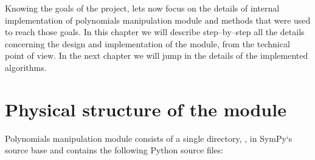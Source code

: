 Knowing the goals of the project, lets now focus on the details of internal implementation
of polynomials manipulation module and methods that were used to reach those goals. In this
chapter we will describe step--by--step all the details concerning the design and implementation
of the module, from the technical point of view. In the next chapter we will jump in the details
of the implemented algorithms.


\section{Physical structure of the module}

Polynomials manipulation module  consists of a single directory, ,
in SymPy`s source base and contains the following Python source files:
